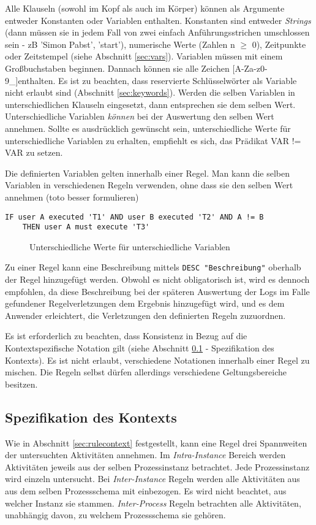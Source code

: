 Alle Klauseln (sowohl im Kopf als auch im Körper) können als Argumente entweder Konstanten oder Variablen enthalten. Konstanten sind entweder \textit{Strings} (dann müssen sie in jedem Fall von zwei einfach Anführungsstrichen umschlossen sein - zB 'Simon Pabst', 'start'), numerische Werte (Zahlen n $\geq$ 0), Zeitpunkte oder Zeitstempel (siehe Abschnitt \ref{sec:vars}). Variablen müssen mit einem Großbuchstaben beginnen. Dannach können sie alle Zeichen [A-Za-z0-9\_]enthalten. Es ist zu beachten, dass reservierte Schlüsselwörter als Variable nicht erlaubt sind (Abschnitt \ref{sec:keywords}). Werden die selben Variablen in unterschiedlichen Klauseln eingesetzt, dann entsprechen sie dem selben Wert. Unterschiedliche Variablen \textit{können} bei der Auswertung den selben Wert annehmen. Sollte es ausdrücklich gewünscht sein, unterschiedliche Werte für unterschiedliche Variablen zu erhalten, empfiehlt es sich, das Prädikat VAR != VAR zu setzen.

Die definierten Variablen gelten innerhalb einer Regel. Man kann die selben Variablen in verschiedenen Regeln verwenden, ohne dass sie den selben Wert annehmen (toto besser formulieren)

\begin{verbatim}
IF user A executed 'T1' AND user B executed 'T2' AND A != B
    THEN user A must execute 'T3'
\end{verbatim}
\begin{figure}[!h]
\caption{Unterschiedliche Werte für unterschiedliche Variablen}
\label{fig:diffvars}
\end{figure}

Zu einer Regel kann eine Beschreibung mittels \texttt{DESC "Beschreibung"} oberhalb der Regel hinzugefügt werden. Obwohl es nicht obligatorisch ist, wird es dennoch empfohlen, da diese Beschreibung bei der späteren Auswertung der Logs im Falle gefundener Regelverletzungen dem Ergebnis hinzugefügt wird, und es dem Anwender erleichtert, die Verletzungen den definierten Regeln zuzuordnen.

Es ist erforderlich zu beachten, dass Konsistenz in Bezug auf die Kontextspezifische Notation gilt (siehe Abschnitt \ref{sec:context} - Spezifikation des Kontexts). Es ist nicht erlaubt, verschiedene Notationen innerhalb einer Regel zu mischen. Die Regeln selbst dürfen allerdings verschiedene Geltungsbereiche besitzen.

\subsection{Spezifikation des Kontexts}
\label{sec:context}
Wie in Abschnitt \ref{sec:rulecontext} festgestellt, kann eine Regel drei Spannweiten der untersuchten Aktivitäten annehmen. Im \textit{Intra-Instance} Bereich werden Aktivitäten jeweils aus der selben Prozessinstanz betrachtet. Jede Prozessinstanz wird einzeln untersucht. Bei \textit{Inter-Instance} Regeln werden alle Aktivitäten aus aus dem selben Prozessschema mit einbezogen. Es wird nicht beachtet, aus welcher Instanz sie stammen. \textit{Inter-Process} Regeln betrachten alle Aktivitäten, unabhängig davon, zu welchem Prozessschema sie gehören.

